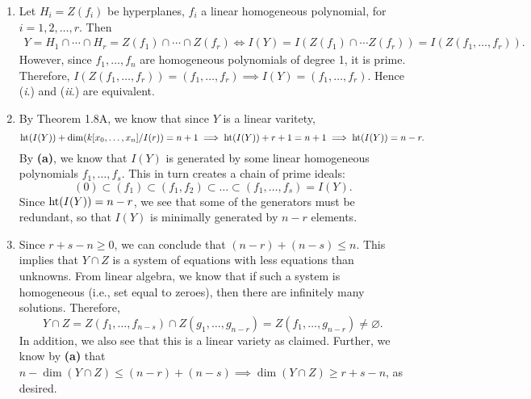 \documentclass[10pt]{amsart}
\begin{document}
\begin{solution}
    \begin{luke}
        \begin{enumerate}
            \item Let $H_i = Z(f_i)$ be hyperplanes, $f_i$ a linear homogeneous polynomial, for $i = 1, 2, \dots, r$. 
            Then 
            \begin{align*}
                Y 
                = H_1 \cap \cdots \cap H_r
                =
                Z(f_1) \cap \cdots \cap Z(f_r)
                \iff
                I(Y) 
                = I(Z(f_1) \cap \cdots Z(f_r))
                =
                I(Z(f_1, \dots, f_r)).
            \end{align*}
            However, since $f_1, \dots, f_n$ are homogeneous polynomials of degree 1, it is prime.
            Therefore, $I(Z(f_1, \dots, f_r)) = (f_1, \dots, f_r) \implies I(Y) = (f_1, \dots, f_r)$.
            Hence (\emph{i}.) and (\emph{ii}.) are equivalent.
            
            \item By Theorem 1.8A, we know that since $Y$ is a linear varitety, 
            \[
                \operatorname{\rm{ht}}(I(Y)) + \operatorname{\rm{dim}}( k[x_0, \dots, x_n]/I(r)) = n + 1
                \implies 
                \operatorname{\rm{ht}}(I(Y)) + r + 1 = n + 1
                \implies 
                \operatorname{\rm{ht}}(I(Y)) = n - r.
            \]
            By {\bf (a)}, we know that $I(Y)$ is generated by some linear homogeneous 
            polynomials $f_1, \dots, f_s$. This in turn creates a chain of prime ideals:
            \[
                (0) \subset (f_1) \subset (f_1, f_2) \subset \dots \subset (f_1, \dots, f_s) = I(Y).
            \]
            Since $\operatorname{\rm{ht}}(I(Y)) = n - r$, we see that some of the generators must be redundant, 
            so that $I(Y)$ is minimally generated by $n - r$ elements. 
            
            \item Since $r + s - n \ge 0$, we can conclude that $(n - r) + (n - s) \le n$. This implies 
            that $Y \cap Z$ is a system of equations with less equations than unknowns. From linear 
            algebra, we know that if such a system is homogeneous (i.e., set equal to zeroes), then 
            there are infinitely many solutions. Therefore, 
            \[
                Y \cap Z = Z(f_1, \dots, f_{n-s}) \cap Z(g_1, \dots, g_{n-r}) = Z(f_1, \dots, g_{n-r}) \ne \varnothing.                
            \] 
            In addition, we also see that this is a linear variety as claimed. Further, we know by {\bf (a)} 
            that $n - \dim(Y \cap Z) \le (n - r) + (n - s) \implies \dim(Y \cap Z) \ge r + s - n$, as desired.



        \end{enumerate}
    \end{luke}
\end{solution}
\end{document}
